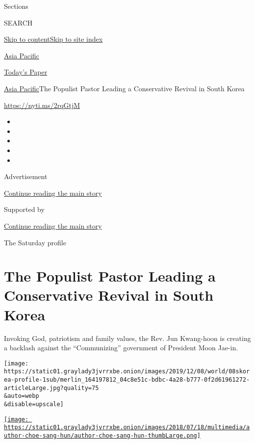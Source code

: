 Sections

SEARCH

\protect\hyperlink{site-content}{Skip to
content}\protect\hyperlink{site-index}{Skip to site index}

\href{https://www.nytimes3xbfgragh.onion/section/world/asia}{Asia
Pacific}

\href{https://myaccount.nytimes3xbfgragh.onion/auth/login?response_type=cookie\&client_id=vi}{}

\href{https://www.nytimes3xbfgragh.onion/section/todayspaper}{Today's
Paper}

\href{/section/world/asia}{Asia Pacific}\textbar{}The Populist Pastor
Leading a Conservative Revival in South Korea

\url{https://nyti.ms/2rqGtjM}

\begin{itemize}
\item
\item
\item
\item
\item
\end{itemize}

Advertisement

\protect\hyperlink{after-top}{Continue reading the main story}

Supported by

\protect\hyperlink{after-sponsor}{Continue reading the main story}

The Saturday profile

\hypertarget{the-populist-pastor-leading-a-conservative-revival-in-south-korea}{%
\section{The Populist Pastor Leading a Conservative Revival in South
Korea}\label{the-populist-pastor-leading-a-conservative-revival-in-south-korea}}

Invoking God, patriotism and family values, the Rev. Jun Kwang-hoon is
creating a backlash against the ``Communizing'' government of President
Moon Jae-in.

\texttt{[image: https://static01.graylady3jvrrxbe.onion/images/2019/12/08/world/08skorea-profile-1sub/merlin\_164197812\_04c8e51c-bdbc-4a28-b777-0f2d61961272-articleLarge.jpg?quality=75\\\&auto=webp\\\&disable=upscale]}

\href{https://www.nytimes3xbfgragh.onion/by/choe-sang-hun}{\texttt{[image: https://static01.graylady3jvrrxbe.onion/images/2018/07/18/multimedia/author-choe-sang-hun/author-choe-sang-hun-thumbLarge.png]}}

